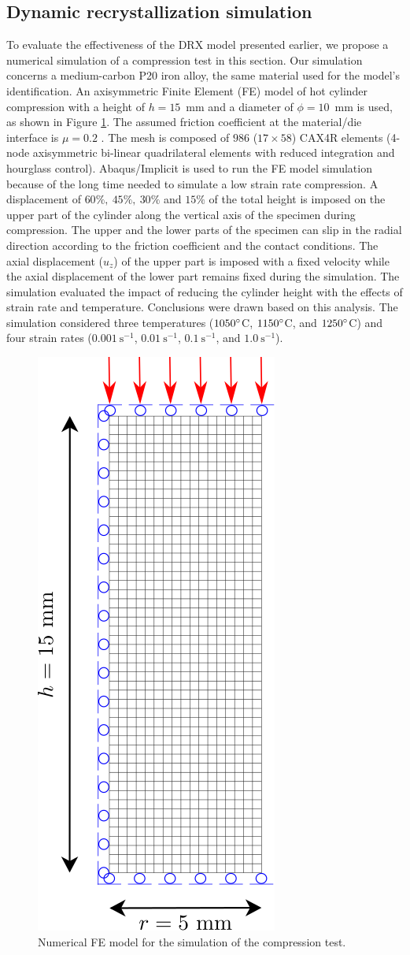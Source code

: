\documentclass[metals,article,submit,pdftex,moreauthors]{Definitions/mdpi}
\DeclareRobustCommand{\ps}{\text{s}^{-1}}
\begin{document}
\subsection{Dynamic recrystallization simulation\label{subsec:DRXSimulation}}

To evaluate the effectiveness of the DRX model presented earlier, we propose a numerical simulation of a compression test in this section.
Our simulation concerns a medium-carbon P20 iron alloy, the same material used for the model's identification.
An axisymmetric Finite Element (FE) model of hot cylinder compression with a height of $h=15$~mm and a diameter of $\phi=10$~mm is used, as shown in Figure \ref{fig:Mesh}.
The assumed friction coefficient at the material/die interface is $\mu=0.2$ \cite{zhang2019elevated,sun2020kinetics}.
The mesh is composed of $986$ ($17\times58$) CAX4R elements (4-node axisymmetric bi-linear quadrilateral elements with reduced integration and hourglass control).
Abaqus/Implicit is used to run the FE model simulation because of the long time needed to simulate a low strain rate compression.
A displacement of $60\%, ~45\%, ~30\%$ and $15\%$ of the total height is imposed on the upper part of the cylinder along the vertical axis of the specimen during compression.
The upper and the lower parts of the specimen can slip in the radial direction according to the friction coefficient and the contact conditions. The axial displacement ($u_z$) of the upper part is imposed with a fixed velocity while the axial displacement of the lower part remains fixed during the simulation.
The simulation evaluated the impact of reducing the cylinder height with the effects of strain rate and temperature. 
Conclusions were drawn based on this analysis.
The simulation considered three temperatures ($1050\degree$C, $1150\degree$C, and $1250\degree$C) and four strain rates ($0.001~\ps$, $0.01~\ps$, $0.1~\ps$, and $1.0~\ps$).
\begin{figure}[H]
\centering
\includegraphics[height=0.7\columnwidth]{Figures/CyCompression2}
\caption{Numerical FE model for the simulation of the compression test.}
\label{fig:Mesh}
\end{figure}
\end{document}
